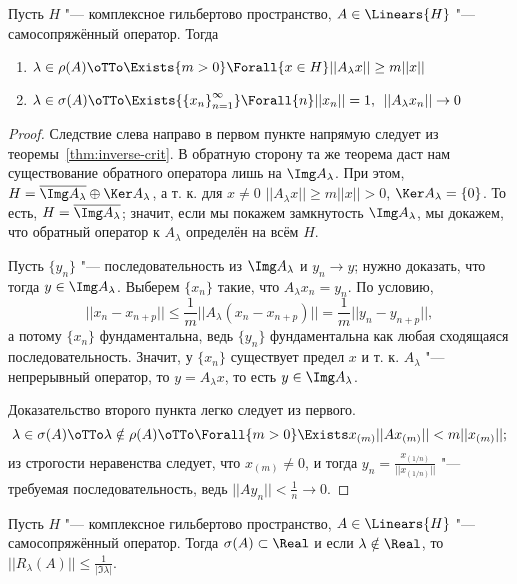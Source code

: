 \documentclass[main]{subfiles}
\begin{document}
\begin{theorem}%
  Пусть \( H \) "--- комплексное гильбертово пространство,
  \( A \in \Linears{H} \) "--- самосопряжённый оператор.
  Тогда
  \begin{enumerate}
    \item \( \lambda \in \rho(A) \oTTo
      \Exists{m > 0} \Forall{x \in H} ||A_\lambda x|| \ge m ||x|| \)
    \item \( \lambda \in \sigma(A) \oTTo
      \Exists{ {\{ x_n \}}_{n=1}^\infty }
      \Forall{n} ||x_n|| = 1, \: \:
      ||A_\lambda x_n|| \to 0 \)
  \end{enumerate}
\end{theorem}
\begin{proof}
  Следствие слева направо в первом пункте напрямую следует из
  теоремы~\ref{thm:inverse-crit}.
  В обратную сторону та же теорема даст нам существование
  обратного оператора лишь на \( \Img A_\lambda \).
  При этом,
  \( H = \overline{\Img A_\lambda} \oplus \Ker A_\lambda \),
  а т. к. для \( x \ne 0 \) \( ||A_\lambda x|| \ge m ||x|| > 0 \),
  \( \Ker A_\lambda = \{ 0 \} \).
  То есть, \( H = \overline{\Img A_\lambda} \);
  значит, если мы покажем замкнутость \( \Img A_\lambda \),
  мы докажем, что обратный оператор к \( A_\lambda \)
  определён на всём \( H \).

  Пусть \( \{ y_n \} \) "--- последовательность из
  \( \Img A_\lambda \) и \( y_n \to y \);
  нужно доказать, что тогда \( y \in \Img A_\lambda \).
  Выберем \( \{ x_n \} \) такие, что \( A_\lambda x_n = y_n \).
  По условию,
  \[ ||x_n - x_{n+p}|| \le
    \frac1m ||A_\lambda (x_n - x_{n+p})|| =
    \frac1m ||y_n - y_{n+p}||,
  \]
  а потому \( \{ x_n \} \) фундаментальна,
  ведь \( \{ y_n \} \) фундаментальна
  как любая сходящаяся последовательность.
  Значит, у \( \{ x_n \} \) существует предел \( x \)
  и т. к. \( A_\lambda \) "--- непрерывный оператор, то
  \( y = A_\lambda x \), то есть \( y \in \Img A_\lambda \).

  Доказательство второго пункта легко следует
  из первого.
  \[
    \lambda \in \sigma(A) \oTTo
    \lambda \notin \rho(A) \oTTo
    \Forall{m > 0} \Exists x_{(m)} ||A x_{(m)}|| < m ||x_{(m)}||;
  \]
  из строгости неравенства следует, что
  \( x_{(m)} \ne 0 \), и тогда
  \( y_n = \frac{x_{(1/n)}}{||x_{(1/n)}||} \) "---
  требуемая последовательность,
  ведь \( ||A y_n|| < \frac1n \to 0 \).
\end{proof}

\begin{theorem}%
  Пусть \( H \) "--- комплексное гильбертово пространство,
  \( A \in \Linears{H} \) "--- самосопряжённый оператор.
  Тогда \( \sigma(A) \subset \Real \) и
  если \( \lambda \notin \Real \), то
  \( ||R_\lambda(A)|| \le \frac{1}{|\Im \lambda|} \).
\end{theorem}
\end{document}
